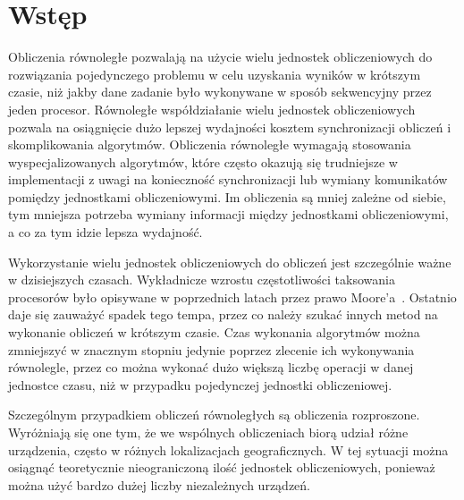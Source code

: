 \documentclass[a4paper,11pt,twoside]{report}
\theoremstyle{definition}
\begin{document}
\thispagestyle{empty}
\newpage

\null\thispagestyle{empty}\newpage


\tableofcontents
\thispagestyle{empty}

\newpage %

\null\thispagestyle{empty}\newpage
\pagestyle{fancy}
\setcounter{page}{11} %

\chapter{Wstęp}
    \label{wstep}

    Obliczenia równoległe pozwalają na użycie wielu jednostek obliczeniowych do rozwiązania pojedynczego problemu w celu uzyskania wyników w krótszym czasie, niż jakby dane zadanie było wykonywane w sposób sekwencyjny przez jeden procesor.
    Równoległe współdziałanie wielu jednostek obliczeniowych pozwala na osiągnięcie dużo lepszej wydajności
    kosztem synchronizacji obliczeń i skomplikowania algorytmów.
    Obliczenia równoległe wymagają stosowania wyspecjalizowanych algorytmów, które często okazują się
    trudniejsze w implementacji z uwagi na konieczność synchronizacji lub wymiany komunikatów pomiędzy jednostkami obliczeniowymi.
    Im obliczenia są mniej zależne od siebie,
    tym mniejsza potrzeba wymiany informacji między jednostkami obliczeniowymi, a co za tym idzie lepsza wydajność.
    
    Wykorzystanie wielu jednostek obliczeniowych do obliczeń jest szczególnie ważne w dzisiejszych czasach.
    Wykładnicze wzrostu częstotliwości taksowania procesorów było
    opisywane w poprzednich latach przez prawo Moore'a~\cite{prawo-moorea}.
    Ostatnio daje się zauważyć spadek tego tempa, przez co należy szukać innych metod na wykonanie obliczeń w krótszym czasie.
    Czas wykonania algorytmów można zmniejszyć w znacznym stopniu jedynie poprzez zlecenie ich wykonywania równolegle,
    przez co można wykonać dużo większą liczbę operacji w danej jednostce czasu,
    niż w przypadku pojedynczej jednostki obliczeniowej.

    Szczególnym przypadkiem obliczeń równoległych są obliczenia rozproszone.
    Wyróżniają się one tym, że we wspólnych obliczeniach biorą udział różne urządzenia, często w różnych lokalizacjach geograficznych.
    W tej sytuacji można osiągnąć teoretycznie nieograniczoną ilość jednostek obliczeniowych,
    ponieważ można użyć bardzo dużej liczby niezależnych urządzeń.
    
\end{document}
